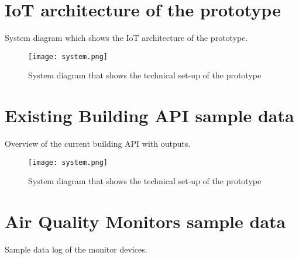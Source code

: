 \begin{appendices}
\section{IoT architecture of the prototype}
\label{appendix:architecture}

System diagram which shows the IoT architecture of the prototype.

\begin{figure}[H]
    \centering
    \texttt{[image: system.png]}
    \caption{System diagram that shows the technical set-up of the prototype}
    \label{fig:timeline}
\end{figure}

\section{Existing Building API sample data}
\label{appendix:architecture}

Overview of the current building API with outputs.

\begin{figure}[H]
    \centering
    \texttt{[image: system.png]}
    \caption{System diagram that shows the technical set-up of the prototype}
    \label{fig:timeline}
\end{figure}

\section{Air Quality Monitors sample data}
\label{appendix:monitors}

Sample data log of the monitor devices.


\end{appendices}
